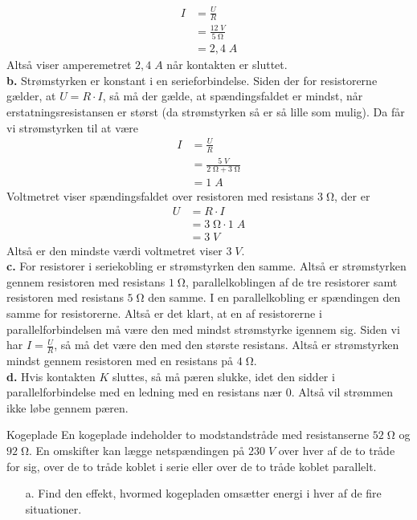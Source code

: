\documentclass{report}
\begin{document}
\begin{equation*}
\begin{split}
  I&=\frac{U}{R}\\ 
  &=\frac{12 \;\unit{V} }{5 \;\unit{\ohm} }\\ 
  &=2,4 \;\unit{A} 
\end{split}
\end{equation*}
Altså viser amperemetret $2,4 \;\unit{A} $ når kontakten er sluttet. \\[1ex]
\textbf{b.}
Strømstyrken er konstant i en serieforbindelse.
Siden der for resistorerne gælder, at $U=R \cdot I$, så må der gælde, at spændingsfaldet er mindst, når erstatningsresistansen er størst (da strømstyrken så er så lille som mulig).
Da får vi strømstyrken til at være
\begin{equation*}
\begin{split}
  I&=\frac{U}{R}\\ 
  &=\frac{5 \;\unit{V} }{2 \;\unit{\ohm} + 3 \;\unit{\ohm} }\\ 
  &=1 \;\unit{A} 
\end{split}
\end{equation*}
Voltmetret viser spændingsfaldet over resistoren med resistans $3 \;\unit{\ohm} $, der er
\begin{equation*}
\begin{split}
  U&= R \cdot I\\ 
  &=3 \;\unit{\ohm} \cdot 1 \;\unit{A} \\ 
  &=3 \;\unit{V} 
\end{split}
\end{equation*}
Altså er den mindste værdi voltmetret viser $3 \;\unit{V} $.\\[1ex]
\textbf{c.}
For resistorer i seriekobling er strømstyrken den samme.
Altså er strømstyrken gennem resistoren med resistans $1 \;\unit{\ohm} $, parallelkoblingen af de tre resistorer samt resistoren med resistans $5 \;\unit{\ohm} $ den samme. 
I en parallelkobling er spændingen den samme for resistorerne.
Altså er det klart, at en af resistorerne i parallelforbindelsen må være den med mindst strømstyrke igennem sig.
Siden vi har $I=\frac{U}{R}$, så må det være den med den største resistans.
Altså er strømstyrken mindst gennem resistoren med en resistans på $4 \;\unit{\ohm} $.\\[1ex]
\textbf{d.}
Hvis kontakten $K$ sluttes, så må pæren slukke, idet den sidder i parallelforbindelse med en ledning med en resistans nær $0$. 
Altså vil strømmen ikke løbe gennem pæren.
\begin{question}{Kogeplade}{}
  En kogeplade indeholder to modstandstråde med resistanserne $52 \;\unit{\ohm} $ og $92 \;\unit{\ohm}$. 
  En omskifter kan lægge netspændingen på $230 \;\unit{V}$ over hver af de to tråde for sig, over de to tråde koblet i serie eller over de to tråde koblet parallelt.
  \begin{itemize}
    \item[a.] Find den effekt, hvormed kogepladen omsætter energi i hver af de fire situationer.
  \end{itemize}
\end{question}
\end{document}
